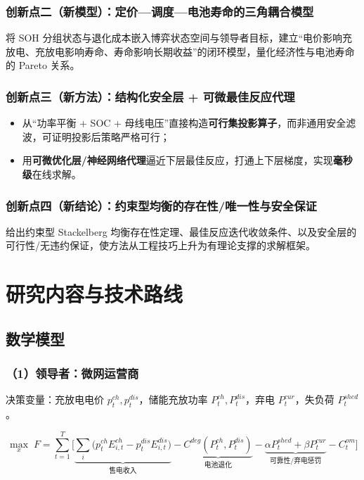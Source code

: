 \documentclass[UTF8,a4paper,11pt]{ctexart}
\begin{document}
\subsubsection*{创新点二（新模型）：定价—调度—电池寿命的三角耦合模型}
将 SOH 分组状态与退化成本嵌入博弈状态空间与领导者目标，建立“电价影响充放电、充放电影响寿命、寿命影响长期收益”的闭环模型，量化经济性与电池寿命的 Pareto 关系。

\subsubsection*{创新点三（新方法）：结构化安全层 + 可微最佳反应代理}
\begin{itemize}
  \item 从“功率平衡 + SOC + 母线电压”直接构造\textbf{可行集投影算子}，而非通用安全滤波，可证明投影后策略严格可行；
  \item 用\textbf{可微优化层/神经网络代理}逼近下层最佳反应，打通上下层梯度，实现\textbf{毫秒级}在线求解。
\end{itemize}

\subsubsection*{创新点四（新结论）：约束型均衡的存在性/唯一性与安全保证}
给出约束型 Stackelberg 均衡存在性定理、最佳反应迭代收敛条件、以及安全层的可行性/无违约保证，使方法从工程技巧上升为有理论支撑的求解框架。

\section{研究内容与技术路线}

\subsection{数学模型}

\subsubsection*{（1）领导者：微网运营商}
决策变量：充放电电价 $p_t^{ch}, p_t^{dis}$，储能充放功率 $P_t^{ch}, P_t^{dis}$，弃电 $P_t^{cur}$，失负荷 $P_t^{shed}$。

\begin{equation}
\max_{x}\; F = \sum_{t=1}^{T}\Big[ \underbrace{\sum_{i} \big(p_t^{ch} E_{i,t}^{ch} - p_t^{dis} E_{i,t}^{dis}\big)}_{\text{售电收入}} - \underbrace{C^{deg}(P_t^{ch},P_t^{dis})}_{\text{电池退化}} - \underbrace{\alpha P_t^{shed} + \beta P_t^{cur}}_{\text{可靠性/弃电惩罚}} - C^{om}_t \Big]
\end{equation}
\end{document}
